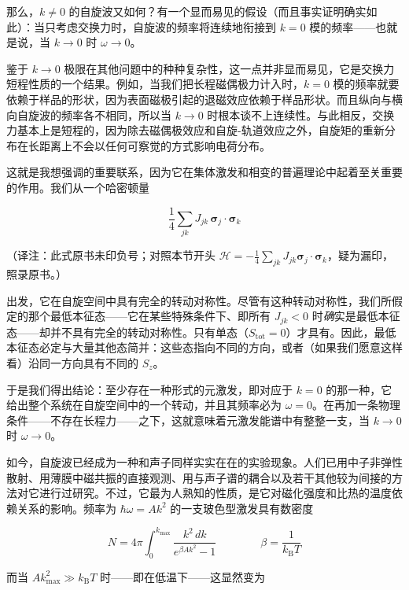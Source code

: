 那么，$k\neq 0$ 的自旋波又如何？有一个显而易见的假设（而且事实证明确实如此）：当只考虑交换力时，自旋波的频率将连续地衔接到 $k=0$ 模的频率——也就是说，当 $k \rightarrow 0$ 时 $\omega \rightarrow 0$。

鉴于 $k \rightarrow 0$ 极限在其他问题中的种种复杂性，这一点并非显而易见，它是交换力短程性质的一个结果。例如，当我们把长程磁偶极力计入时，$k=0$ 模的频率就要依赖于样品的形状，因为表面磁极引起的退磁效应依赖于样品形状。而且纵向与横向自旋波的频率各不相同，所以当 $k \rightarrow 0$ 时根本谈不上连续性。与此相反，交换力基本上是短程的，因为除去磁偶极效应和自旋-轨道效应之外，自旋矩的重新分布在长距离上不会以任何可察觉的方式影响电荷分布。

这就是我想强调的重要联系，因为它在集体激发和相变的普遍理论中起着至关重要的作用。我们从一个哈密顿量

\begin{equation*}
\frac{1}{4} \sum_{jk} J_{jk}\,\boldsymbol{\sigma}_{j}\cdot\boldsymbol{\sigma}_{k}
\end{equation*}

（译注：此式原书未印负号；对照本节开头 $\mathcal{H} = -\frac{1}{4}\sum_{jk}J_{jk}\boldsymbol{\sigma}_{j}\cdot\boldsymbol{\sigma}_{k}$，疑为漏印，照录原书。）

出发，它在自旋空间中具有完全的转动对称性。尽管有这种转动对称性，我们所假定的那个最低本征态——它在某些特殊条件下、即所有 $J_{jk} < 0$ 时\emph{确}实是最低本征态——却并不具有完全的转动对称性。只有单态（$S_{\mathrm{tot}} = 0$）才具有。因此，最低本征态必定与大量其他态简并：这些态指向不同的方向，或者（如果我们愿意这样看）沿同一方向具有不同的 $S_{z}$。

于是我们得出结论：至少存在一种形式的元激发，即对应于 $k=0$ 的那一种，它给出整个系统在自旋空间中的一个转动，并且其频率必为 $\omega = 0$。在再加一条物理条件——不存在长程力——之下，这就意味着元激发能谱中有整整一支，当 $k \rightarrow 0$ 时 $\omega \rightarrow 0$。

如今，自旋波已经成为一种和声子同样实实在在的实验现象。人们已用中子非弹性散射、用薄膜中磁共振的直接观测、用与声子谱的耦合以及若干其他较为间接的方法对它进行过研究。不过，它最为人熟知的性质，是它对磁化强度和比热的温度依赖关系的影响。频率为 $\hbar\omega = Ak^{2}$ 的一支玻色型激发具有数密度

\begin{equation*}
N = 4\pi\int_{0}^{k_{\max}} \frac{k^{2}\,dk}{e^{\beta Ak^{2}} - 1} \qquad\qquad \beta = \frac{1}{k_{\mathrm{B}}T}
\end{equation*}

而当 $Ak_{\max}^{2} \gg k_{\mathrm{B}}T$ 时——即在低温下——这显然变为

